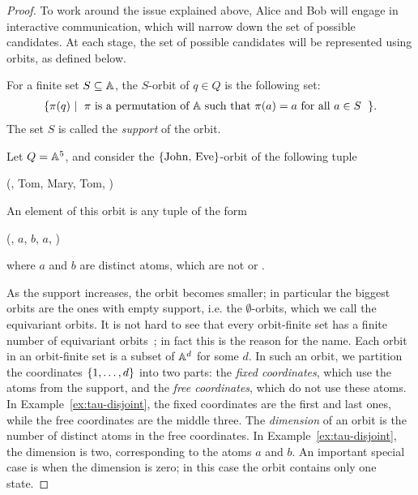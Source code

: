 \begin{proof}
To work around the issue explained above, Alice and Bob will engage in interactive communication, which will narrow down the set of possible candidates. At each stage, the set of possible candidates will be represented using orbits, as defined below.

\begin{definition}[Orbit] \label{def:orbit}
    For a finite set $S \subseteq \mathbb A$, the $S$-orbit of $q \in Q$ is the following set:
    \begin{align*}
    \setbuild{ \pi(q)}{$\pi$ is a permutation of $\atoms$ such that $\pi(a)=a$ for all $a \in S$}.
    \end{align*}
The set $S$ is called the \emph{support} of the orbit.
\end{definition}

\begin{myexample}\label{ex:tau-disjoint}
    Let $Q = \mathbb A^5$, and consider the $\{\text{{John}, {Eve}}\}$-orbit of the following tuple
    \begin{center}
        (, Tom, Mary, Tom, )
    \end{center}
    An element of this orbit is any tuple of the form 
    \begin{center}
        (, $a$, $b$, $a$, )
    \end{center}
    where $a$ and $b$ are distinct atoms, which are not  or . 
\end{myexample}

 As the support increases, the orbit becomes smaller; in particular the biggest orbits are the ones with empty support, i.e.
 the $\emptyset$-orbits, which we call the equivariant orbits. It is not hard to see that every orbit-finite set has a finite number of equivariant orbits~\cite[Lemma 1.4]{bojanczyk_slightly}; in fact this is the reason for the name.  
Each orbit in an orbit-finite set is a subset of $\mathbb A^d$ for some $d$. In such an orbit, we partition the coordinates $\{1,\ldots,d\}$ into two parts: the \emph{fixed coordinates}, which use the atoms from the support, and the \emph{free coordinates}, which do not use these atoms. In Example~\ref{ex:tau-disjoint}, the fixed coordinates are  the first and last ones, while the free coordinates are the middle three. The \emph{dimension} of an orbit is the number of distinct atoms in the free coordinates. In Example~\ref{ex:tau-disjoint}, the dimension is two, corresponding to the atoms $a$ and $b$. 
An important special case is when the dimension is zero; in this case the orbit contains only one state.


\end{proof}
